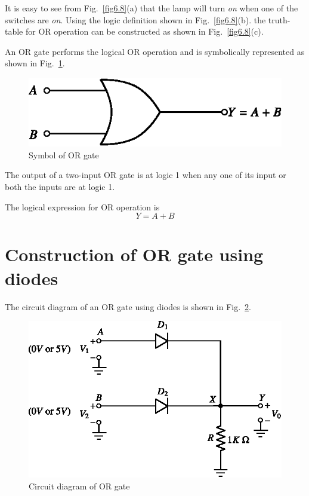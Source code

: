 It is easy to see from Fig.~\ref{fig6.8}(a) that the lamp will turn {\em on} when one of the switches are {\em on}. Using the logic definition shown in Fig.~\ref{fig6.8}(b). the truth-table for OR operation can be constructed as shown in Fig.~\ref{fig6.8}(c).

An OR gate performs the logical OR operation and is symbolically represented as shown in Fig.~\ref{fig6.9}.
\begin{figure}[H]
\centering
\includegraphics{chap6/fig83_6.9.eps}
\caption{Symbol of OR gate}\label{fig6.9}
\end{figure}

The output of a two-input OR gate is at logic 1 when any one of its input or both the inputs are at logic 1.

The logical expression for OR operation is
$$
Y=A+B
$$

\eject

\section{Construction of OR gate using diodes}\label{sec6.18}

The circuit diagram of an OR gate using diodes is shown in Fig.~\ref{fig6.10}.
\begin{figure}[H]
\centering
\includegraphics{chap6/fig84_6.10.eps}
\caption{Circuit diagram of OR gate}\label{fig6.10}
\end{figure}

